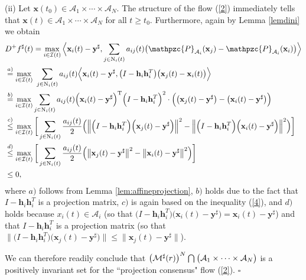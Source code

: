 \documentclass[a4paper, 11pt]{article}
\newcommand*\mcap{\mathbin{\mathpalette\mcapinn\relax}}
\newcommand*\mcapinn[2]{\vcenter{\hbox{$\mathsurround=0pt
  \ifx\displaystyle#1\textstyle\else#1\fi\bigcap$}}}
\def\T{^{\rm\tiny T}}
\begin{document}
\noindent(ii) Let $\mathbf{x}(t_0)\in\mathcal{A}_1\times \cdots \times \mathcal{A}_N$. The structure of the flow (\ref{2}) immediately tells that $\mathbf{x}(t)\in\mathcal{A}_1\times \cdots \times \mathcal{A}_N$ for all $t\geq t_0$.  Furthermore, again by Lemma \ref{lemdini} we obtain
\begin{align}\label{8}
&D^+f^\sharp(t)=\max_{i\in\mathcal{I}(t)} \Big\langle \mathbf{x}_i(t)-\mathbf{y}^\sharp, \sum_{j\in \mathrm{N}_i(t)}a_{ij}(t)\big(\mathpzc{P}_{\mathcal{A}_i}(\mathbf{x}_j)-\mathpzc{P}_{\mathcal{A}_i}(\mathbf{x}_i)\big)\Big\rangle\nonumber\\
&\stackrel{a)}{=}\max_{i\in\mathcal{I}(t)}\  \sum_{j\in \mathrm{N}_i(t)}a_{ij}(t) \Big\langle \mathbf{x}_i(t)-\mathbf{y}^\sharp,  \big(I-\mathbf{h}_i\mathbf{h}_i^T\big) \big(\mathbf{x}_j(t)-\mathbf{x}_i(t)\big)\Big\rangle  \nonumber\\
&\stackrel{b)}{=}\max_{i\in\mathcal{I}(t)}  \sum_{j\in \mathrm{N}_i(t)}a_{ij}(t) \Big( \mathbf{x}_i(t)-\mathbf{y}^\sharp\Big)\T \Big(I-\mathbf{h}_i\mathbf{h}_i^T\Big)^2  \cdot\Big(\big(\mathbf{x}_j(t)-\mathbf{y}^\sharp\big)-\big(\mathbf{x}_i(t)-\mathbf{y}^\sharp\big)\Big)\nonumber\\
&\stackrel{c)}{\leq}  \max_{i\in\mathcal{I}(t)}\bigg[  \sum_{j\in \mathrm{N}_i(t)}\frac{a_{ij}(t)}{2}  \Big(\Big\|\Big(I-\mathbf{h}_i\mathbf{h}_i^T\Big)\Big(\mathbf{x}_j(t)-\mathbf{y}^\sharp\Big)\Big\|^2 - \Big\|\Big(I-\mathbf{h}_i\mathbf{h}_i^T\Big)\Big(\mathbf{x}_i(t)-\mathbf{y}^\sharp\Big)\Big\|^2  \Big)\bigg]\nonumber\\
&\stackrel{d)}{\leq}  \max_{i\in\mathcal{I}(t)}\bigg[  \sum_{j\in \mathrm{N}_i(t)}\frac{a_{ij}(t)}{2}  \Big(\big\|\mathbf{x}_j(t)-\mathbf{y}^\sharp\big\|^2 - \big\|\mathbf{x}_i(t)-\mathbf{y}^\sharp\big\|^2  \Big)\bigg]\nonumber\\
&\leq 0,
\end{align}
where $a)$ follows from Lemma \ref{lem:affineprojection}, $b)$ holds due to the fact that $I-\mathbf{h}_i\mathbf{h}_i^T$ is a projection  matrix, $c)$ is again based on the inequality (\ref{4}), and $d)$ holds because $x_i(t)\in \mathcal{A}_i$ (so that $\big(I-\mathbf{h}_i\mathbf{h}_i^T\big)\big(\mathbf{x}_i(t)-\mathbf{y}^\sharp\big)=\mathbf{x}_i(t)-\mathbf{y}^\sharp$) and   that  $I-\mathbf{h}_i\mathbf{h}_i^T$ is a projection  matrix (so that $\big\|\big(I-\mathbf{h}_i\mathbf{h}_i^T\big)\big(\mathbf{x}_j(t)-\mathbf{y}^\sharp\big)\big\|\leq \big\|\mathbf{x}_j(t)-\mathbf{y}^\sharp\big\|$).

We can therefore readily conclude that $\big(\mathcal{M}^\sharp(r)\big)^{N}\mcap\big(\mathcal{A}_1\times \cdots \times \mathcal{A}_N\big)$ is a positively invariant set for the ``projection consensus" flow (\ref{2}). \hfill$\square$
\end{document}
